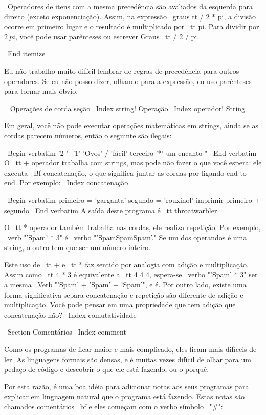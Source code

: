 \documentclass[10pt]{book}
\begin{document}
\begin {itemize}
{\ Operadores de itens com a mesma precedência são avaliados da esquerda para
  direito (exceto exponenciação). Assim, na expressão {\ graus tt /
    2 * pi}, a divisão ocorre em primeiro lugar e o resultado é multiplicado
  por {\ tt pi}. Para dividir por $ 2 \ pi $, você pode usar parênteses ou escrever
  {Graus \ tt / 2 / pi}.

\ End {itemize}

Eu não trabalho muito difícil lembrar de regras de precedência para outros
operadores. Se eu não posso dizer, olhando para a expressão, eu uso
parênteses para tornar mais óbvio.

\ {} Operações de corda seção
\ Index {string! Operação}
\ Index {operador! String}

Em geral, você não pode executar operações matemáticas em strings, ainda
se as cordas parecem números, então o seguinte são ilegais:

\ Begin {verbatim}
'2 '- '1' 'Ovos' / 'fácil' terceiro '*' um encanto "
\ End {verbatim}
%
O {\ tt +} operador trabalha com strings, mas
pode não fazer o que você espera: ele executa
{\ Bf concatenação}, o que significa juntar as cordas por
ligando-end-to-end. Por exemplo:
\ Index {concatenação}

\ Begin {verbatim}
primeiro = 'garganta'
segundo = 'rouxinol'
imprimir primeiro + segundo
\ End {verbatim}
%
A saída deste programa é {\ tt throatwarbler}.

O {\ tt *} operador também trabalha nas cordas, ele realiza repetição.
Por exemplo, \ verb "'Spam' * 3" é \ verbo "'SpamSpamSpam'." Se um dos operandos
é uma string, o outro tem que ser um número inteiro.

Este uso de {\ tt +} e {\ tt *} faz sentido por
analogia com adição e multiplicação. Assim como {\ tt 4 * 3} é
equivalente a {\ tt 4 4 4}, espera-se \ verbo "'Spam' * 3" ser a mesma
\ Verb "'Spam' + 'Spam' + 'Spam'", e é. Por outro lado, existe uma
forma significativa separa concatenação e repetição são
diferente de adição e multiplicação.
Você pode pensar em uma propriedade que tem adição
que concatenação não?
\ Index {} comutatividade


\ Section {Comentários}
\ Index {comment}

Como os programas de ficar maior e mais complicado, eles ficam mais difíceis
de ler. As linguagens formais são densas, e é muitas vezes difícil de
olhar para um pedaço de código e descobrir o que ele está fazendo, ou o porquê.

Por esta razão, é uma boa idéia para adicionar notas aos seus programas para explicar
em linguagem natural que o programa está fazendo. Estas notas são chamados
{comentários \ bf} e eles começam com o verbo símbolo \ "#":

}
\end{itemize}
\end{document}
